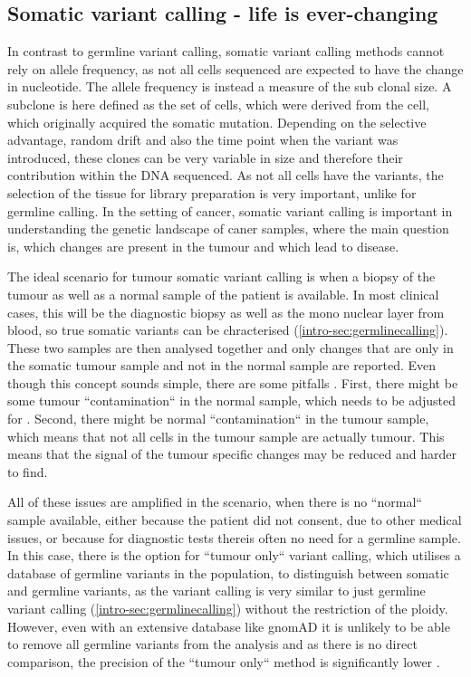 \subsection[Somatic]{Somatic variant calling - life is ever-changing}
\label{intro-sec:somaticcalling}
In contrast to germline variant calling, somatic variant calling methods cannot rely on allele frequency, as not all cells sequenced are expected to have the change in nucleotide. The allele frequency is instead a measure of the sub clonal size. A subclone is here defined as the set of cells, which were derived from the cell, which originally acquired the somatic mutation. Depending on the selective advantage, random drift and also the time point when the variant was introduced, these clones can be very variable in size and therefore their contribution within the DNA sequenced.
As not all cells have the variants, the selection of the tissue for library preparation is very important, unlike for germline calling. 
In the setting of cancer, somatic variant calling is important in understanding the genetic landscape of caner samples, where the main question is, which changes are present in the tumour and which lead to disease.

The ideal scenario for tumour somatic variant calling is when a biopsy of the tumour as well as a normal sample of the patient is available. In most clinical cases, this will be the diagnostic biopsy as well as the mono nuclear layer from blood, so true somatic variants can be chracterised (\autoref{intro-sec:germlinecalling}). 
These two samples are then analysed together and only changes that are only in the somatic tumour sample and not in the normal sample are reported. Even though this concept sounds simple, there are some pitfalls \cite{GATKTeam2021a}. First, there might be some tumour ``contamination`` in the normal sample, which needs to be adjusted for \cite{Kim2018,TaylorWeiner2018}. Second, there might be normal ``contamination`` in the tumour sample, which means that not all cells in the tumour sample are actually tumour. This means that the signal of the tumour specific changes may be reduced and harder to find.

All of these issues are amplified in the scenario, when there is no ``normal`` sample available, either because the patient did not consent, due to other medical issues, or because for diagnostic tests thereis often no need for a germline sample. In this case, there is the option for ``tumour only`` variant calling, which utilises a database of germline variants in the population, to distinguish between somatic and germline variants, as the variant calling is very similar to just germline variant calling (\autoref{intro-sec:germlinecalling}) without the restriction of the ploidy. However, even with an extensive database like gnomAD \cite{Karczewski2020} it is unlikely to be able to remove all germline variants from the analysis and as there is no direct comparison, the precision of the ``tumour only`` method is significantly lower \cite{Karimnezhad2020}.
